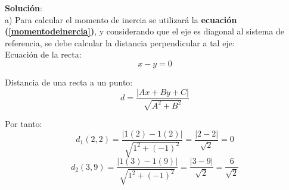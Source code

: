 \documentclass[letter,oneside,11pt]{article}
\begin{document}
\begin{minipage}[b]{.9\linewidth}
\textbf{Solución}:\\
a) Para calcular el momento de inercia se utilizará la \textbf{ecuación
(\ref{momentodeinercia})}, y considerando que el eje es diagonal al sistema de
referencia, se debe calcular la distancia perpendicular a tal eje: \\

Ecuación de la recta:
\begin{equation*}
    x - y = 0
\end{equation*}

Distancia de una recta a un punto:
\begin{equation*}
    d = \frac{| A x + B y + C |}{\sqrt{A^2 + B^2}}
\end{equation*}

Por tanto: \\
\begin{equation*}
    d_1(2,2) = \frac{| 1 (2) - 1 (2) |}{\sqrt{1^2 + (-1)^2}} = \frac{|2 - 2|}{\sqrt{2}} = 0
\end{equation*}
\begin{equation*}
    d_2(3,9) = \frac{| 1 (3) - 1 (9) |}{\sqrt{1^2 + (-1)^2}} = \frac{|3 - 9|}{\sqrt{2}} = \frac{6}{\sqrt{2}}
\end{equation*}
\end{minipage}
\end{document}
